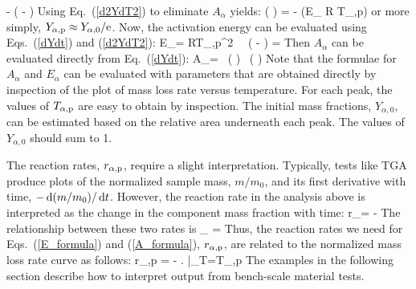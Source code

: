 \documentclass[11pt]{book}
\begin{document}
   \approx -  \; \exp \left( - \right)
\ee
Using Eq.~(\ref{d2YdT2}) to eliminate $A_\alpha$ yields:
\be
   \ln \left(  \right) = -    \quad \quad (E_\alpha {} R T_{\alpha,{\rm p}})
\ee
or more simply, $Y_{\alpha,{\rm p}} \approx Y_{\alpha,0}/{\rm e}$. Now, the activation energy can be evaluated using Eqs.~(\ref{dYdt}) and (\ref{d2YdT2}):
\be
   E_\alpha = RT_{\alpha,{\rm p}}^2 \,  \, \exp \left( - \right) =  
   \approx {}   \label{E_formula}
\ee
Then $A_\alpha$ can be evaluated directly from Eq.~(\ref{dYdt}):
\be
   A_\alpha =  \, \exp \left(  \right) \approx {} \, \exp \left(  \right) \label{A_formula}
\ee
Note that the formulae for $A_\alpha$ and $E_\alpha$ can be evaluated with parameters that are obtained directly by inspection of the plot of mass loss rate versus temperature. For each peak, the values of $T_{\alpha,{\rm p}}$ are easy to obtain by inspection. The initial mass fractions, $Y_{\alpha,0}$, can be estimated based on the relative area underneath each peak. The values of $Y_{\alpha,0}$ should sum to 1.

The reaction rates, $r_{\alpha,{\rm p}}$, require a slight interpretation. Typically, tests like TGA produce plots of the normalized sample mass, $m/m_0$, and its first derivative with time, $-\,\mathrm{d} (m/m_0) /\,\mathrm{d} t$. However, the reaction rate in the analysis above is interpreted as the change in the component mass fraction with time:
\be
   r_\alpha = - 
\ee
The relationship between these two rates is
\be
   \sum_\alpha {} =  
\ee
Thus, the reaction rates we need for Eqs.~(\ref{E_formula}) and (\ref{A_formula}), $r_{\alpha,{\rm p}}$, are related to the normalized mass loss rate curve as follows:
\be
   r_{\alpha,{\rm p}} = -  \left.  \right|_{T=T_{\alpha,{\rm p}}}
   \label{rr_calc}
\ee
The examples in the following section describe how to interpret output from bench-scale material tests.
\end{document}
